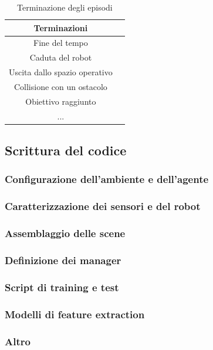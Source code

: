 \begin{table}[h]
    \centering
    \begin{tabular}{|c|c|}
    \hline
    \textbf{Terminazioni}\\\hline
    Fine del tempo\\ \hline
    Caduta del robot\\ \hline
    Uscita dallo spazio operativo\\ \hline
    Collisione con un ostacolo\\ \hline
    Obiettivo raggiunto\\ \hline
    ...\\ \hline
    \end{tabular}
    \caption{Terminazione degli episodi}
    \label{tab:term}
\end{table}


\subsection{Scrittura del codice}
\subsubsection{Configurazione dell'ambiente e dell'agente}


\subsubsection{Caratterizzazione dei sensori e del robot}


\subsubsection{Assemblaggio delle scene}


\subsubsection{Definizione dei manager}


\subsubsection{Script di training e test}


\subsubsection{Modelli di feature extraction}


\subsubsection{Altro}



